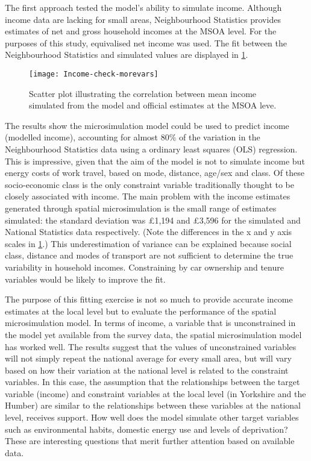 The first approach tested the model's ability to simulate income. Although
income data are lacking for small areas, Neighbourhood Statistics
provides estimates of net and gross household incomes at the MSOA level. For the purposes of
this study, equivalised net income was used. The fit between the Neighbourhood
Statistics and simulated values are displayed in \cref{fig:income-test}.

\begin{figure}[h]
 \centering
 \texttt{[image: Income-check-morevars]}
\caption[Scatter plot of simulated vs official estimated income]{Scatter plot
illustrating the correlation between mean
income simulated from the model and official estimates at the MSOA
leve.}
 \label{fig:income-test}
\end{figure}

The results show the microsimulation model could be used to predict income
(modelled income), accounting for almost 80\% of the variation in the
Neighbourhood Statistics data using a ordinary least squares (OLS) regression.
This is impressive, given that the aim of the model is not to simulate
income but energy costs of work travel, based on mode, distance, age/sex
and class. Of these socio-economic class is the only constraint
variable traditionally thought to be closely associated with income.
The main problem with the income estimates generated through spatial
microsimulation is the small range of estimates simulated:
the standard deviation was
\pounds1,194 and \pounds3,596 for the simulated and National Statistics data
respectively. (Note the
differences in the x and y axis scales in \cref{fig:income-test}.)
This underestimation of variance can be explained because social class,
distance and modes of transport are not sufficient to determine the true
variability in household incomes. Constraining by car ownership and tenure
variables would be likely to improve the fit.

The purpose of this fitting exercise is not so much to provide accurate income
estimates at the local level but to evaluate the
performance of the spatial microsimulation model. In terms of income, a variable
that is unconstrained in the model yet available from the survey data, the
spatial microsimulation model has worked well. The results suggest that the
values of unconstrained variables will not simply repeat the national average
for every small area, but will vary based on how their variation at the
national level is related to the constraint variables. In this case, the
assumption that the relationships between the target variable (income) and
constraint variables at the local level (in Yorkshire and the Humber) are
similar to the relationships between these variables at the national level,
receives support. How well does the model simulate other target variables such
as environmental habits, domestic energy use and levels of deprivation?
These are interesting
questions that merit further attention based on available data.

